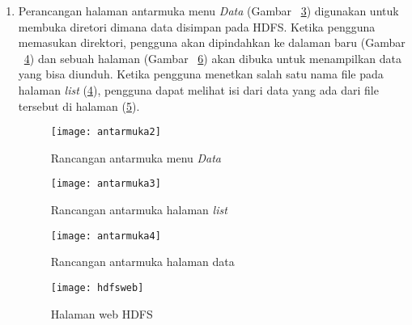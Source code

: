 \begin{enumerate}
\begin{itemize}
\end{itemize} 

Setelah pengguna menekan tombol \textit{submit} pada \textit{form}, pengguna akan dipindakan ke halaman baru seperti pada Gambar ~\ref{fig:antarmukaresult}. Selain itu, halaman \textit{Hadoop web UI} akan terbuka di tab baru seperti pada Gambar ~\ref{fig:hadoopweb}.

\begin{figure}[H]
    \centering  
    \texttt{[image: antarmukaresult]}  
    \caption[Rancangan antaramuka \textit{result}]{Rancangan antaramuka halaman \textit{result}} 
    \label{fig:antarmukaresult} 
\end{figure}

\begin{figure}[H]
    \centering  
    \texttt{[image: hadoopweb]}  
    \caption[Halaman web Hadoop]{Halaman web Hadoop} 
    \label{fig:hadoopweb} 
\end{figure}


\item Perancangan halaman antarmuka menu \textit{Data} (Gambar ~\ref{fig:antarmuka2}) digunakan untuk membuka diretori dimana data disimpan pada HDFS. Ketika pengguna memasukan direktori, pengguna akan dipindahkan ke dalaman baru (Gambar ~\ref{fig:antarmuka3}) dan sebuah halaman (Gambar ~\ref{fig:hdfsweb}) akan dibuka untuk menampilkan data yang bisa diunduh. Ketika pengguna menetkan salah satu nama file pada halaman \textit{list} (\ref{fig:antarmuka3}), pengguna dapat melihat isi dari data yang ada dari file tersebut di halaman (\ref{fig:antarmuka4}).  

\begin{figure}[H]
    \centering  
    \texttt{[image: antarmuka2]}  
    \caption[Rancangan antarmuka menu \textit{Data}]{Rancangan antarmuka menu \textit{Data}} 
    \label{fig:antarmuka2} 
\end{figure}

\begin{figure}[H]
    \centering  
    \texttt{[image: antarmuka3]}  
    \caption[Rancangan antarmuka halaman \textit{list}]{Rancangan antarmuka halaman \textit{list}} 
    \label{fig:antarmuka3} 
\end{figure}

\begin{figure}[H]
    \centering  
    \texttt{[image: antarmuka4]}  
    \caption[Rancangan antarmuka halaman data]{Rancangan antarmuka halaman data} 
    \label{fig:antarmuka4} 
\end{figure}

\begin{figure}[H]
    \centering  
    \texttt{[image: hdfsweb]}  
    \caption[Halaman web HDFS]{Halaman web HDFS} 
    \label{fig:hdfsweb} 
\end{figure}


\end{enumerate}




